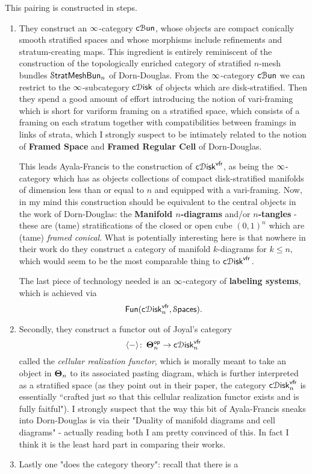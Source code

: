 This pairing is constructed in steps. 
\begin{enumerate}
    \item They construct an $\operatorname{\infty}$-category $\operatorname{{\sf c}\mathcal B\mathsf{un}}$, whose objects are compact conically smooth stratified spaces and whose morphisms include refinements and stratum-creating maps. This ingredient is entirely reminiscent of the construction of the topologically enriched category of stratified $n$-mesh bundles $\mathcal S{\sf tratMeshBun}_n$ of Dorn-Douglas. From the $\operatorname{\infty}$-category $\operatorname{{\sf c}\mathcal B\mathsf{un}}$ we can restrict to the $\operatorname{\infty}$-subcategory $\operatorname{{\sf c}\mathcal D{\mathsf{isk}}}$ of objects which are disk-stratified. Then they spend a good amount of effort introducing the notion of vari-framing which is short for variform framing on a stratified space, which consists of a framing on each stratum together with compatibilities between framings in links of strata, which I strongly suspect to be intimately related to the notion of \textbf{Framed Space} and \textbf{Framed Regular Cell} of  Dorn-Douglas.

    This leads Ayala-Francis to the construction of $\operatorname{{\sf c}\mathcal D{\mathsf{isk}}}^{\operatorname{\sf vfr}}$, as being the $\operatorname{\infty}$-category which has as objects collections of compact disk-stratified manifolds of dimension less than or equal to $n$ and equipped with a vari-framing. Now, in my mind this construction should be equivalent to the central objects in the work of Dorn-Douglas: the \textbf{Manifold $n$-diagrams} and/or \textbf{$n$-tangles} - these are (tame) stratifications of the closed or open cube $(0,1)^n$ which are (tame) \textit{framed conical}. What is potentially interesting here is that nowhere in their work do they construct a category of manifold $k$-diagrams for $k\leq n,$ which would seem to be the most comparable thing to $\operatorname{{\sf c}\mathcal D{\mathsf{isk}}}^{\operatorname{\sf vfr}}.$  

    The last piece of technology needed is an $\operatorname{\infty}$-category of \textbf{labeling systems}, which is achieved via \[\operatorname{\sf Fun}(\operatorname{{\sf c}\mathcal D{\mathsf{isk}}}^{\operatorname{\sf vfr}}_n,\operatorname{\mathcal S\mathsf{paces}}).\] 
    \item Secondly, they construct a functor out of Joyal's category \[\langle -\rangle\colon \operatorname{\boldsymbol{\Theta}}_n^{\operatorname{\mathsf{op}}} \rightarrow \operatorname{{\sf c}\mathcal D{\mathsf{isk}}}_n^{\operatorname{\sf vfr}}\] called the \textit{cellular realization functor}, which is morally meant to take an object in $\operatorname{\boldsymbol{\Theta}}_n$ to its associated pasting diagram, which is further interpreted as a stratified space (as they point out in their paper, the category $\operatorname{{\sf c}\mathcal D{\mathsf{isk}}}_n^{\operatorname{\sf vfr}}$ is essentially ``crafted just so that this cellular realization functor exists and is fully faitful"). I strongly suspect that the way this bit of Ayala-Francis sneaks into Dorn-Douglas is via their "Duality of manifold diagrams and cell diagrams" - actually reading both I am pretty convinced of this. In fact I think it is the least hard part in comparing their works.
    \item Lastly one "does the category theory": recall that there is a 


\end{enumerate}

